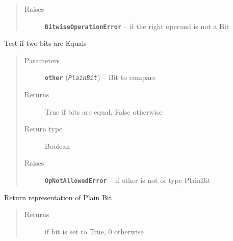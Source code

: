 \documentclass[letterpaper,10pt,english]{sphinxmanual}
\begin{document}
\begin{fulllineitems}
\begin{fulllineitems}
\begin{quote}
\begin{description}
\item[{Raises}] \leavevmode
\textbf{\texttt{BitwiseOperationError}} -- if the right operand is not a Bit

\end{description}\end{quote}

\end{fulllineitems}


\begin{fulllineitems}
\label{datatypes.bits:datatypes.bits.Bit.PlainBit.__eq__}
Test if two bits are Equals
\begin{quote}\begin{description}
\item[{Parameters}] \leavevmode
\textbf{\texttt{other}} (\emph{\texttt{PlainBit}}) -- Bit to compare

\item[{Returns}] \leavevmode
True if bits are equal, False otherwise

\item[{Return type}] \leavevmode
Boolean

\item[{Raises}] \leavevmode
\textbf{\texttt{OpNotAllowedError}} -- if other is not of type PlainBit

\end{description}\end{quote}

\end{fulllineitems}


\begin{fulllineitems}
\label{datatypes.bits:datatypes.bits.Bit.PlainBit.__repr__}
Return representation of Plain Bit
\begin{quote}\begin{description}
\item[{Returns}]  if bit is set to True, 0 otherwise

\end{description}\end{quote}

\end{fulllineitems}



\end{fulllineitems}
\end{document}
